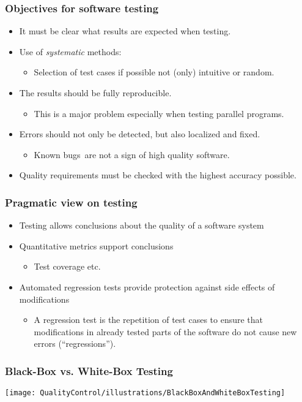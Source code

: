 \begin{frame}
\frametitle{Objectives for software testing}
\begin{itemize}
  \item It must be clear what results are expected when testing.
  \item Use of \emph{systematic} methods:
    \begin{itemize}
      \item Selection of test cases if possible not (only) intuitive or random.
    \end{itemize}
  \item The results should be fully reproducible. 
    \begin{itemize}
      \item This is a major problem especially when testing parallel programs.
    \end{itemize}
  \item Errors should not only be detected, but also localized and fixed. %
    \begin{itemize}
      \item \glq Known bugs\grq\ are not a sign of high quality software.
    \end{itemize}       
  \item Quality requirements must be checked with the highest accuracy possible.
\end{itemize}
\end{frame}


\begin{frame}
\frametitle{Pragmatic view on testing}
\begin{itemize}
    \item Testing allows conclusions about the quality of a software system 
    \item Quantitative metrics support conclusions 
         \begin{itemize}\item Test coverage etc. 
         \end{itemize} 
    \item Automated regression tests provide protection against side effects of modifications 
		\begin{itemize}
			\item A regression test is the repetition of test cases to ensure that modifications in already tested parts of the software do not cause new errors (``regressions''). 
		\end{itemize}
\end{itemize}
\end{frame}


\begin{frame}
\frametitle{Black-Box vs. White-Box Testing}
  \begin{center}
  \texttt{[image: QualityControl/illustrations/BlackBoxAndWhiteBoxTesting]}
  \end{center}
\end{frame}

